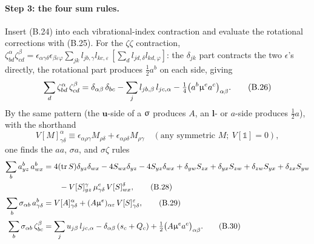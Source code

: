 \paragraph{Step 3: the four sum rules.}
Insert (B.24) into each vibrational-index contraction and evaluate the rotational corrections with (B.25). For the $\zeta\zeta$ contraction, $\zeta^\alpha_{bd}\zeta^\beta_{cd}=\epsilon_{\alpha\gamma\delta}\epsilon_{\beta\varepsilon\varphi}\sum_{jk}l_{jb,\gamma}l_{kc,\varepsilon}\,[\sum_d l_{jd,\delta}l_{kd,\varphi}]$: the $\delta_{jk}$ part contracts the two $\epsilon$'s directly, the rotational part produces $\tfrac12a^b$ on each side, giving
\begin{equation}
\sum_d\zeta^{\alpha}_{bd}\,\zeta^{\beta}_{cd}
=\delta_{\alpha\beta}\,\delta_{bc}-\sum_jl_{jb,\beta}\,l_{jc,\alpha}
-\tfrac14\bigl(a^{b}\upmu^{e}a^{c}\bigr)_{\alpha\beta}. \tag{B.26}
\end{equation}
By the same pattern (the $\mathbf u$-side of a $\upsigma$ produces $A$, an $\mathbf l$- or $a$-side produces $\tfrac12a$), with the shorthand
\begin{equation}
V[M]^{\alpha}_{\gamma\delta}\equiv\epsilon_{\alpha\rho\gamma}M_{\rho\delta}+\epsilon_{\alpha\rho\delta}M_{\rho\gamma}
\quad(\text{any symmetric }M;\ V[\mathbb 1]=0), \tag{B.27}
\end{equation}
one finds the $aa$, $\sigma a$, and $\sigma\zeta$ rules
\begin{align}
\sum_b a^{b}_{yz}\,a^{b}_{wx}
&=4(\operatorname{tr}S)\delta_{yz}\delta_{wx}-4S_{wx}\delta_{yz}-4S_{yz}\delta_{wx}
+\delta_{yw}S_{zx}+\delta_{yx}S_{zw}+\delta_{zw}S_{yx}+\delta_{zx}S_{yw}\nonumber\\
&\qquad-V[S]^{\gamma}_{yz}\,\mu^{e}_{\gamma\delta}\,V[S]^{\delta}_{wx}, \tag{B.28}\\[2pt]
\sum_b\sigma_{\alpha b}\,a^{b}_{\gamma\delta}
&=V[A]^{\alpha}_{\gamma\delta}+(A\upmu^{e})_{\alpha\varepsilon}\,V[S]^{\varepsilon}_{\gamma\delta}, \tag{B.29}\\[2pt]
\sum_b\sigma_{\alpha b}\,\zeta^{\beta}_{bc}
&=\sum_ju_{j\beta}\,l_{jc,\alpha}-\delta_{\alpha\beta}\,(s_c+Q_c)+\tfrac12\bigl(A\upmu^{e}a^{c}\bigr)_{\alpha\beta}. \tag{B.30}
\end{align}

